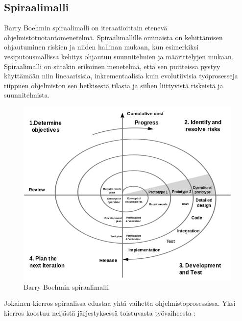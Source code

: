 \documentclass[finnish,12pt]{tktltiki2}
\theoremstyle{definition}
\theoremstyle{remark}
\begin{document}
\subsection{Spiraalimalli}

Barry Boehmin spiraalimalli on iteraatioittain etenevä ohjelmistotuotantomenetelmä. Spiraalimallille ominaista on kehittämisen ohjautuminen riskien ja niiden hallinan mukaan, kun esimerkiksi vesiputousmallissa kehitys ohjautuu suunnitelmien ja määrittelyjen mukaan. Spiraalimalli on siitäkin erikoinen menetelmä, että sen puitteissa pystyy käyttämään niin lineaarisisia, inkrementaalisia kuin evolutiivisia työprosesseja riippuen ohjelmiston sen hetkisestä tilasta ja siihen liittyvistä riskeistä ja suunnitelmista. 

\begin{figure}[ht!]
\centering
{}
\includegraphics[width=150mm]{spiral.png}
\caption{Barry Boehmin spiraalimalli}
\label{overflow}
\end{figure}

Jokainen kierros spiraalissa edustaa yhtä vaihetta ohjelmistoprosessissa.  Yksi kierros koostuu neljästä järjestyksessä toistuvasta työvaiheesta \cite{Sommerville10}:
\end{document}
